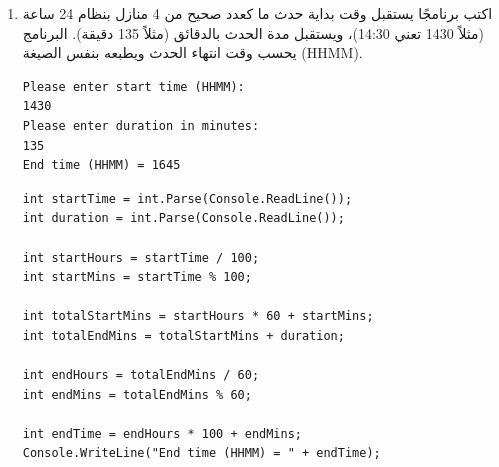 \documentclass[14pt]{extarticle}
\begin{document}
\begin{enumerate}[itemsep=3em]
\begin{boxSolution}
\begin{english}
\begin{verbatim}
int years = totalDays / 365;
int remainingDays = totalDays % 365;

int months = remainingDays / 30;
int days = remainingDays % 30;

Console.WriteLine("Years = " + years);
Console.WriteLine("Months = " + months);
Console.WriteLine("Days = " + days);
    \end{verbatim}
    \end{english}
    \end{boxSolution}
    \fi
    \fi
    \clearpage

    \item
    اكتب برنامجًا يستقبل وقت بداية حدث ما كعدد صحيح من 4 منازل بنظام 24 ساعة (مثلاً 1430 تعني 14:30)، ويستقبل مدة الحدث بالدقائق (مثلاً 135 دقيقة).
    البرنامج يحسب وقت انتهاء الحدث ويطبعه بنفس الصيغة (HHMM).
    \ifdetailed
    \begin{boxExample}
    \begin{english}
    \begin{verbatim}
Please enter start time (HHMM):
1430
Please enter duration in minutes:
135
End time (HHMM) = 1645
    \end{verbatim}
    \end{english}
    \end{boxExample}
    \ifwithsols
    \begin{boxSolution}
    \begin{english}
    \begin{verbatim}
int startTime = int.Parse(Console.ReadLine());
int duration = int.Parse(Console.ReadLine());

int startHours = startTime / 100;
int startMins = startTime % 100;

int totalStartMins = startHours * 60 + startMins;
int totalEndMins = totalStartMins + duration;

int endHours = totalEndMins / 60;
int endMins = totalEndMins % 60;

int endTime = endHours * 100 + endMins;
Console.WriteLine("End time (HHMM) = " + endTime);
    \end{verbatim}
    \end{english}
    \end{boxSolution}
    \clearpage
    \fi
    \fi


\end{enumerate}
\end{document}
